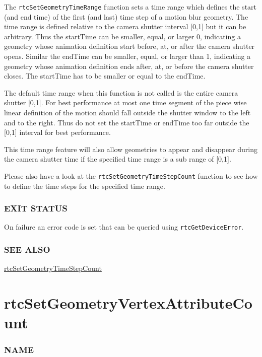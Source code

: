 The \texttt{rtcSetGeometryTimeRange} function sets a time range which
defines the start (and end time) of the first (and last) time step of a
motion blur geometry. The time range is defined relative to the camera
shutter interval {[}0,1{]} but it can be arbitrary. Thus the startTime
can be smaller, equal, or larger 0, indicating a geometry whose
animation definition start before, at, or after the camera shutter
opens. Similar the endTime can be smaller, equal, or larger than 1,
indicating a geometry whose animation definition ends after, at, or
before the camera shutter closes. The startTime has to be smaller or
equal to the endTime.

The default time range when this function is not called is the entire
camera shutter {[}0,1{]}. For best performance at most one time segment
of the piece wise linear definition of the motion should fall outside
the shutter window to the left and to the right. Thus do not set the
startTime or endTime too far outside the {[}0,1{]} interval for best
performance.

This time range feature will also allow geometries to appear and
disappear during the camera shutter time if the specified time range is
a sub range of {[}0,1{]}.

Please also have a look at the \texttt{rtcSetGeometryTimeStepCount}
function to see how to define the time steps for the specified time
range.

\subsubsection{EXIT STATUS}\label{exit-status}

On failure an error code is set that can be queried using
\texttt{rtcGetDeviceError}.

\subsubsection{SEE ALSO}\label{see-also}

\hyperref[rtcsetgeometrytimestepcount]{rtcSetGeometryTimeStepCount}

\pagebreak

\section{rtcSetGeometryVertexAttributeCount}\label{rtcsetgeometryvertexattributecount}

\subsubsection{NAME}\label{name}

